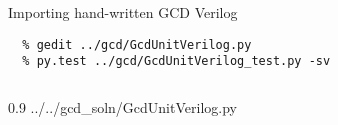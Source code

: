 \begin{task}\begin{frame}[fragile]{Importing hand-written GCD Verilog}

\vspace{-0.15in}
\begin{Verbatim}[commandchars=\\\{\}]
  % cd \midtilde/pymtl-tut/build
  % gedit ../gcd/GcdUnitVerilog.py
  % py.test ../gcd/GcdUnitVerilog_test.py -sv
\end{Verbatim}

\vspace{-0.1in}
\begin{cbxcols}
\begin{column}{0.9\tw}
%
{../../gcd_soln/GcdUnitVerilog.py}
  \end{column}
\end{cbxcols}

\end{frame}
\end{task}


%
%
%
%
%
%
%
%
%
%

